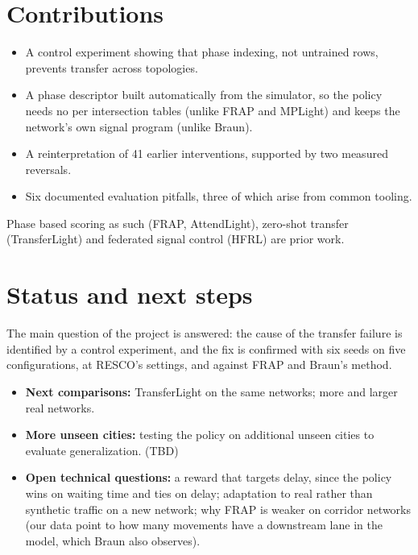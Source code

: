 \documentclass[10pt,twocolumn,a4paper]{article}
\begin{document}
\section{Contributions}
\begin{itemize}
\item A control experiment showing that phase indexing, not untrained rows, prevents
      transfer across topologies.
\item A phase descriptor built automatically from the simulator, so the policy needs no per
      intersection tables (unlike FRAP and MPLight) and keeps the network's own signal
      program (unlike Braun).
\item A reinterpretation of 41 earlier interventions, supported by two measured reversals.
\item Six documented evaluation pitfalls, three of which arise from common tooling.
\end{itemize}
Phase based scoring as such (FRAP, AttendLight), zero-shot transfer (TransferLight) and
federated signal control (HFRL) are prior work.

\section{Status and next steps}
The main question of the project is answered: the cause of the transfer failure is
identified by a control experiment, and the fix is confirmed with six seeds on five
configurations, at RESCO's settings, and against FRAP and Braun's method.
\begin{itemize}
\item \textbf{Next comparisons:} TransferLight on the same networks; more and larger real
      networks.
\item \textbf{More unseen cities:} testing the policy on additional unseen cities to evaluate generalization. (TBD)
\item \textbf{Open technical questions:} a reward that targets delay, since the policy wins on
      waiting time and ties on delay; adaptation to real rather than synthetic traffic on a new
      network; why FRAP is weaker on corridor networks (our data point to how many movements
      have a downstream lane in the model, which Braun also observes).
\end{itemize}
\end{document}

